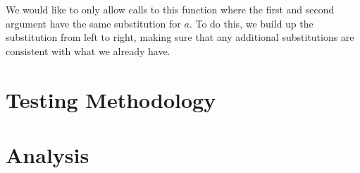 \documentclass[aps,letterpaper,11pt]{revtex4}
\begin{document}


We would like to only allow calls to this function where the first and second argument have the same substitution
for $a$. To do this, we build up the substitution from left to right, making sure that any additional 
substitutions are consistent with what we already have.


\newpage
\section{Testing Methodology}

\newpage
\section{Analysis}
\end{document}
